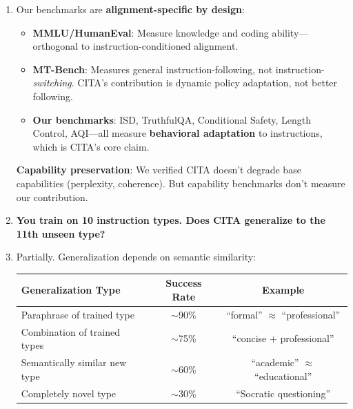 \begin{enumerate}[label=\textbf{Q\arabic*.}, leftmargin=*, itemsep=8pt]
\item[\ding{224}] Our benchmarks are \textbf{alignment-specific by design}:

\begin{itemize}[leftmargin=*,itemsep=2pt]
    \item \textbf{MMLU/HumanEval}: Measure knowledge and coding ability---orthogonal to instruction-conditioned alignment.

    \item \textbf{MT-Bench}: Measures general instruction-following, not instruction-\textit{switching}. CITA's contribution is dynamic policy adaptation, not better following.

    \item \textbf{Our benchmarks}: ISD, TruthfulQA, Conditional Safety, Length Control, AQI---all measure \textbf{behavioral adaptation} to instructions, which is CITA's core claim.
\end{itemize}

\textbf{Capability preservation}: We verified CITA doesn't degrade base capabilities (perplexity, coherence). But capability benchmarks don't measure our contribution.

\vspace{4mm}

\item[\ding{93}] \textbf{You train on 10 instruction types. Does CITA generalize to the 11th unseen type?}

\item[\ding{224}] Partially. Generalization depends on semantic similarity:

\begin{table}[H]
\centering
\small
\begin{tabular}{@{}lcc@{}}
\toprule
\textbf{Generalization Type} & \textbf{Success Rate} & \textbf{Example} \\
\midrule
Paraphrase of trained type & $\sim$90\% & ``formal'' $\approx$ ``professional'' \\
\hline
Combination of trained types & $\sim$75\% & ``concise + professional'' \\
\hline
Semantically similar new type & $\sim$60\% & ``academic'' $\approx$ ``educational'' \\
\hline
Completely novel type & $\sim$30\% & ``Socratic questioning'' \\
\bottomrule
\end{tabular}
\end{table}


\end{enumerate}
